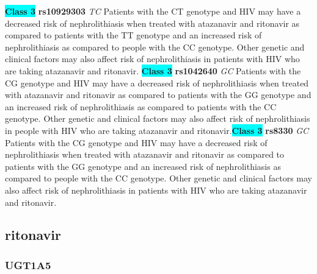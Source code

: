 \documentclass{book}
\begin{document}
\begin{center}
\textbf{\colorbox{cyan} {Class 3}} \textbf{ rs10929303 } \textit{ TC }
Patients with the CT genotype and HIV may have a decreased risk of nephrolithiasis when treated with atazanavir and ritonavir as compared to patients with the TT genotype and an increased risk of nephrolithiasis as compared to people with the CC genotype. Other genetic and clinical factors may also affect risk of nephrolithiasis in patients with HIV who are taking atazanavir and ritonavir. \textbf{\colorbox{cyan} {Class 3}} \textbf{ rs1042640 } \textit{ GC }
Patients with the CG genotype and HIV may have a decreased risk of nephrolithiasis when treated with atazanavir and ritonavir as compared to patients with the GG genotype and an increased risk of nephrolithiasis as compared to patients with the CC genotype. Other genetic and clinical factors may also affect risk of nephrolithiasis in people with HIV who are taking atazanavir and ritonavir.\textbf{\colorbox{cyan} {Class 3}} \textbf{ rs8330 } \textit{ GC }
Patients with the CG genotype and HIV may have a decreased risk of nephrolithiasis when treated with atazanavir and ritonavir as compared to patients with the GG genotype and an increased risk of nephrolithiasis as compared to people with the CC genotype. Other genetic and clinical factors may also affect risk of nephrolithiasis in patients with HIV who are taking atazanavir and ritonavir.


\end{center}\subsection{ ritonavir }


\subsubsection{ UGT1A5 }
\end{document}
